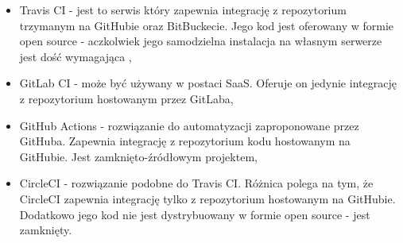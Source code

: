 \begin{itemize}
    \item Travis CI - jest to serwis który zapewnia integrację z repozytorium trzymanym na GitHubie oraz BitBuckecie. Jego kod jest oferowany w formie open source - aczkolwiek jego samodzielna instalacja na własnym serwerze jest dość wymagająca \cite{TravisCI},
    \item GitLab CI - może być używany w postaci SaaS. Oferuje on jedynie integrację z repozytorium hostowanym przez GitLaba,
    \item GitHub Actions - rozwiązanie do automatyzacji zaproponowane przez GitHuba. Zapewnia integrację z repozytorium kodu hostowanym na GitHubie. Jest zamknięto-źródłowym projektem,
    \item CircleCI - rozwiązanie podobne do Travis CI. Różnica polega na tym, że CircleCI zapewnia integrację tylko z repozytorium hostowanym na GitHubie. Dodatkowo jego kod nie jest dystrybuowany w formie open source - jest zamknięty.
\end{itemize}